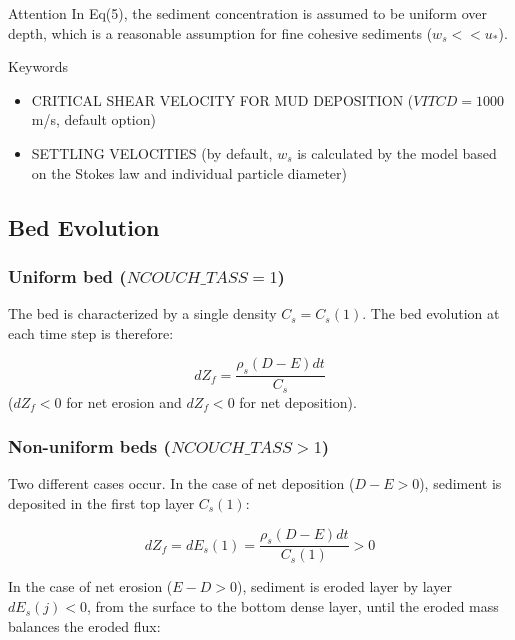 \medskip
\begin{bclogo}[couleur = blue!10, arrondi = 0.10, logo = \bcattention]{\textsf{Attention}}
In Eq(5), the sediment concentration is assumed to be uniform over depth,
which is a reasonable assumption for fine cohesive sediments ($w_s << u_*$).
\end{bclogo}

\medskip
\begin{bclogo}[couleur=blue!10,arrondi=0.1, logo=\bcinfo]{Keywords}
\begin{itemize}
\item {\ttfamily CRITICAL SHEAR VELOCITY FOR MUD DEPOSITION} ($VITCD = 1000$ m/s, default option)
\item {\ttfamily SETTLING VELOCITIES} (by default, $w_s$ is
calculated by the model based on the Stokes law and individual particle
diameter)
\end{itemize}
\end{bclogo}

\subsection{Bed Evolution}


\subsubsection{Uniform bed ($NCOUCH\_TASS = 1$)}
The bed is characterized by a single density $C_s = C_s(1)$. The bed
evolution at each time step is therefore:

\begin{equation*}
dZ_f =\frac{\rho_s (D-E) dt}{C_s} 
\end{equation*}
($dZ_f < 0$ for net erosion and $dZ_f < 0$ for net
deposition).

\subsubsection{Non-uniform beds ($NCOUCH\_TASS > 1$)}
Two different cases occur. In the case of net deposition ($D-E > 0$),
sediment is deposited in the first top layer $C_s(1)$:

\begin{equation*}
dZ_f = dE_s(1) = \frac{\rho_s(D-E)dt}{C_s(1)} > 0 
\end{equation*}

In the case of net erosion ($E-D > 0$), sediment is eroded layer by
layer $dE_s(j) < 0$, from the surface to the bottom dense layer, until
the eroded mass balances the eroded flux:

